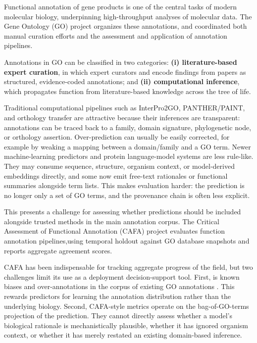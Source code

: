 \documentclass[
  11pt,
]{article}
\begin{document}
Functional annotation of gene products is one of the central
tasks of modern molecular biology, underpinning high-throughput
analyses of molecular data. The Gene Ontology (GO) project organizes
these annotations, and coordinated both manual curation efforts and
the assessment and application of annotation
pipelines\cite{goconsortium2023}.

Annotations in GO can be classified in two categories: \textbf{(i)
literature-based expert curation}, in which expert curators and encode
findings from papers as structured, evidence-coded annotations;
and \textbf{(ii) computational inference}, which propagates function
from literature-based knowledge across the tree of life.

Traditional computational pipelines such as InterPro2GO,
PANTHER/PAINT, and orthology transfer are attractive because their
inferences are transparent: annotations can be traced back to a
family, domain signature, phylogenetic node, or orthology
assertion. Over-prediction can usually be easily corrected, for
example by weaking a mapping between a domain/family and a GO
term. Newer machine-learning predictors and protein language-model
systems are less rule-like. They may consume sequence, structure,
organism context, or model-derived embeddings directly, and some now
emit free-text rationales or functional summaries alongside term
lists. This makes evaluation harder: the prediction is no longer only
a set of GO terms, and the provenance chain is often less explicit.

This presents a challenge for assessing whether predictions should be
included alongside trusted methods in the main annotation corpus. The
Critical Assessment of Functional Annotation (CAFA)
project \cite{radivojac2013,jiang2016,zhou2019} evaluates function
annotation pipelines,using temporal holdout against GO database
snapshots and reports aggregate agreement scores.

CAFA has been indispensable for tracking aggregate progress of the
field, but two challenges limit its use as a deployment decision-support
tool. First, is known biases and over-annotations in the corpus of existing GO annotations
\cite{gaudet2017,goconsortium2023,skunca2012,haynes2018,schnoes2013}. This rewards predictors
for learning the annotation distribution rather than the underlying
biology. Second, CAFA-style metrics operate on the bag-of-GO-terms
projection of the prediction. They cannot directly assess whether a
model's biological rationale is mechanistically plausible, whether it
has ignored organism context, or whether it has merely restated an
existing domain-based inference.
\end{document}
